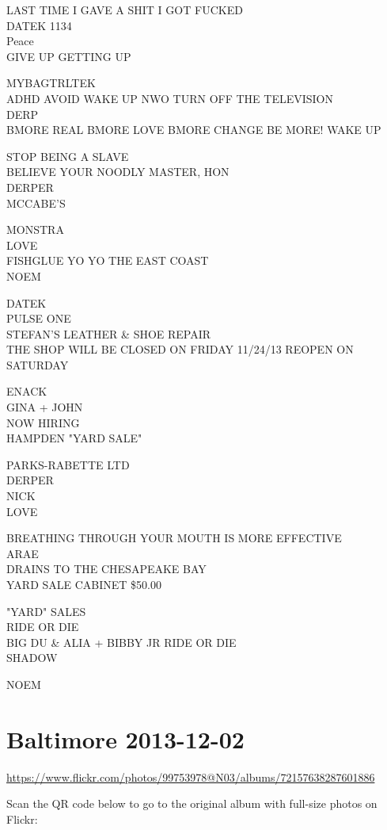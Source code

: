 \documentclass[10pt,letterpaper]{article}
\begin{document}
LAST TIME I GAVE A SHIT I GOT FUCKED\\
DATEK 1134\\
Peace\\
GIVE UP GETTING UP

MYBAGTRLTEK\\
ADHD AVOID WAKE UP NWO TURN OFF THE TELEVISION\\
DERP\\
BMORE REAL BMORE LOVE BMORE CHANGE BE MORE! WAKE UP

STOP BEING A SLAVE\\
BELIEVE YOUR NOODLY MASTER, HON\\
DERPER\\
MCCABE'S

MONSTRA\\
LOVE\\
FISHGLUE YO YO THE EAST COAST\\
NOEM

DATEK\\
PULSE ONE\\
STEFAN'S LEATHER \& SHOE REPAIR\\
THE SHOP WILL BE CLOSED ON FRIDAY 11/24/13 REOPEN ON SATURDAY

ENACK\\
GINA + JOHN\\
NOW HIRING\\
HAMPDEN "YARD SALE"

PARKS{-}RABETTE LTD\\
DERPER\\
NICK\\
LOVE

BREATHING THROUGH YOUR MOUTH IS MORE EFFECTIVE\\
ARAE\\
DRAINS TO THE CHESAPEAKE BAY\\
YARD SALE CABINET \$50.00

"YARD" SALES\\
RIDE OR DIE\\
BIG DU \& ALIA + BIBBY JR RIDE OR DIE\\
SHADOW

NOEM


\section*{Baltimore 2013-12-02}

\url{https://www.flickr.com/photos/99753978@N03/albums/72157638287601886}

Scan the QR code below to go to the original album with full-size photos on Flickr:
\end{document}
